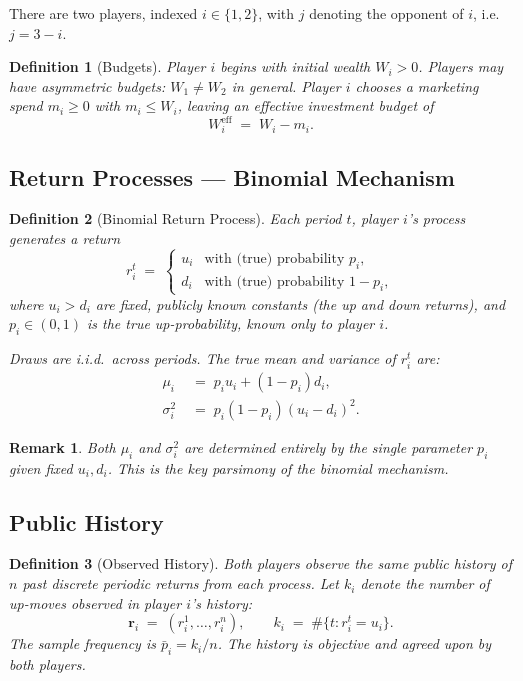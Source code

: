 \documentclass[12pt,a4paper]{article}
\newtheorem{definition}{Definition}[section]
\newtheorem{remark}{Remark}[section]
\newcommand{\1}{\mathbf{1}}
\begin{document}
There are two players, indexed $i \in \{1, 2\}$, with $j$ denoting the opponent of $i$, i.e.\ $j = 3 - i$.

\begin{definition}[Budgets]
Player $i$ begins with initial wealth $W_i > 0$. Players may have asymmetric budgets: $W_1 \neq W_2$ in general. Player $i$ chooses a marketing spend $m_i \geq 0$ with $m_i \leq W_i$, leaving an effective investment budget of
\[
  W_i^{\mathrm{eff}} \;=\; W_i - m_i.
\]
\end{definition}

\subsection{Return Processes — Binomial Mechanism}

\begin{definition}[Binomial Return Process]
Each period $t$, player $i$'s process generates a return
\[
  r_i^t \;=\;
  \begin{cases}
    u_i & \text{with (true) probability } p_i,\\
    d_i & \text{with (true) probability } 1 - p_i,
  \end{cases}
\]
where $u_i > d_i$ are fixed, publicly known constants (the up and down returns), and $p_i \in (0,1)$ is the \emph{true up-probability}, known only to player $i$.

Draws are i.i.d.\ across periods. The \emph{true} mean and variance of $r_i^t$ are:
\begin{align}
  \mu_i &\;=\; p_i u_i + (1 - p_i) d_i, \label{eq:true_mean}\\
  \sigma_i^2 &\;=\; p_i(1-p_i)(u_i - d_i)^2. \label{eq:true_var}
\end{align}
\end{definition}

\begin{remark}
Both $\mu_i$ and $\sigma_i^2$ are determined entirely by the single parameter $p_i$ given fixed $u_i, d_i$. This is the key parsimony of the binomial mechanism.
\end{remark}

\subsection{Public History}

\begin{definition}[Observed History]
Both players observe the same public history of $n$ past discrete periodic returns from each process. Let $k_i$ denote the number of up-moves observed in player $i$'s history:
\[
  \mathbf{r}_i \;=\; (r_i^1, \ldots, r_i^n), \qquad k_i \;=\; \#\{t : r_i^t = u_i\}.
\]
The sample frequency is $\bar{p}_i = k_i / n$. The history is objective and agreed upon by both players.
\end{definition}
\end{document}
